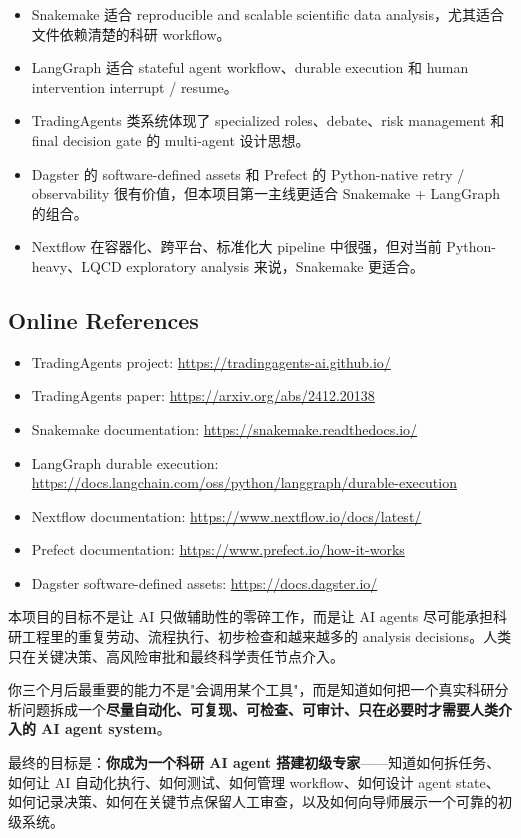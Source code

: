 \documentclass[11pt,a4paper,fontset=fandol]{ctexart}
\begin{document}
\begin{itemize}
  \item Snakemake 适合 reproducible and scalable scientific data analysis，尤其适合文件依赖清楚的科研 workflow。
  \item LangGraph 适合 stateful agent workflow、durable execution 和 human intervention interrupt / resume。
  \item TradingAgents 类系统体现了 specialized roles、debate、risk management 和 final decision gate 的 multi-agent 设计思想。
  \item Dagster 的 software-defined assets 和 Prefect 的 Python-native retry / observability 很有价值，但本项目第一主线更适合 Snakemake + LangGraph 的组合。
  \item Nextflow 在容器化、跨平台、标准化大 pipeline 中很强，但对当前 Python-heavy、LQCD exploratory analysis 来说，Snakemake 更适合。
\end{itemize}

\subsection*{Online References}
\begin{itemize}
  \item TradingAgents project: \url{https://tradingagents-ai.github.io/}
  \item TradingAgents paper: \url{https://arxiv.org/abs/2412.20138}
  \item Snakemake documentation: \url{https://snakemake.readthedocs.io/}
  \item LangGraph durable execution: \url{https://docs.langchain.com/oss/python/langgraph/durable-execution}
  \item Nextflow documentation: \url{https://www.nextflow.io/docs/latest/}
  \item Prefect documentation: \url{https://www.prefect.io/how-it-works}
  \item Dagster software-defined assets: \url{https://docs.dagster.io/}
\end{itemize}

\begin{tcolorbox}[colback=green!3!white,colframe=green!50!black,title=给学生的最后提醒]
本项目的目标不是让 AI 只做辅助性的零碎工作，而是让 AI agents 尽可能承担科研工程里的重复劳动、流程执行、初步检查和越来越多的 analysis decisions。人类只在关键决策、高风险审批和最终科学责任节点介入。

你三个月后最重要的能力不是"会调用某个工具"，而是知道如何把一个真实科研分析问题拆成一个\textbf{尽量自动化、可复现、可检查、可审计、只在必要时才需要人类介入的 AI agent system}。

最终的目标是：\textbf{你成为一个科研 AI agent 搭建初级专家}——知道如何拆任务、如何让 AI 自动化执行、如何测试、如何管理 workflow、如何设计 agent state、如何记录决策、如何在关键节点保留人工审查，以及如何向导师展示一个可靠的初级系统。
\end{tcolorbox}
\end{document}
